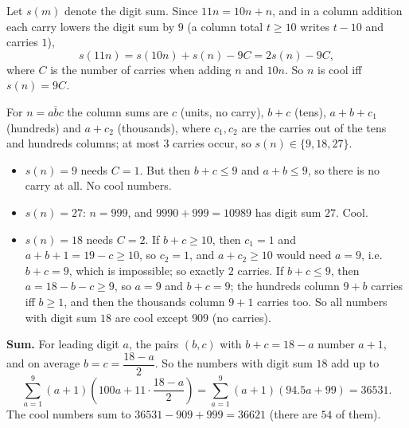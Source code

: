 Let $s(m)$ denote the digit sum. Since $11n=10n+n$, and in a column addition each carry lowers the digit sum by $9$ (a column total $t\ge10$ writes $t-10$ and carries $1$),
\[
s(11n)=s(10n)+s(n)-9C=2s(n)-9C,
\]
where $C$ is the number of carries when adding $n$ and $10n$. So $n$ is cool iff $s(n)=9C$.

For $n=\overline{abc}$ the column sums are $c$ (units, no carry), $b+c$ (tens), $a+b+c_1$ (hundreds) and $a+c_2$ (thousands), where $c_1,c_2$ are the carries out of the tens and hundreds columns; at most $3$ carries occur, so $s(n)\in\{9,18,27\}$.
\begin{itemize}
\item $s(n)=9$ needs $C=1$. But then $b+c\le9$ and $a+b\le9$, so there is no carry at all. No cool numbers.
\item $s(n)=27$: $n=999$, and $9990+999=10989$ has digit sum $27$. Cool.
\item $s(n)=18$ needs $C=2$. If $b+c\ge10$, then $c_1=1$ and $a+b+1=19-c\ge10$, so $c_2=1$, and $a+c_2\ge10$ would need $a=9$, i.e.\ $b+c=9$, which is impossible; so exactly $2$ carries. If $b+c\le9$, then $a=18-b-c\ge9$, so $a=9$ and $b+c=9$; the hundreds column $9+b$ carries iff $b\ge1$, and then the thousands column $9+1$ carries too. So all numbers with digit sum $18$ are cool except $909$ (no carries).
\end{itemize}
\textbf{Sum.} For leading digit $a$, the pairs $(b,c)$ with $b+c=18-a$ number $a+1$, and on average $b=c=\dfrac{18-a}{2}$. So the numbers with digit sum $18$ add up to
\[
\sum_{a=1}^{9}(a+1)\left(100a+11\cdot\dfrac{18-a}{2}\right)=\sum_{a=1}^{9}(a+1)\left(94.5a+99\right)=36531 .
\]
The cool numbers sum to $36531-909+999=\boxed{36621}$ (there are $54$ of them).
